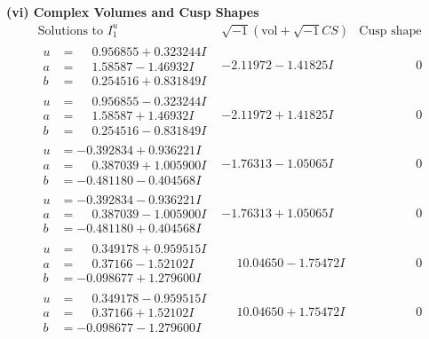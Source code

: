 \documentclass[1p]{elsarticle_modified}
\theoremstyle{definition}
\newcommand{\I}{\sqrt{-1}}
\begin{document}
\newpage\flushleft \textbf{(vi) Complex Volumes and Cusp Shapes}
$$\begin{array}{c|c|c}  
\text{Solutions to }I^u_{1}& \I (\text{vol} + \sqrt{-1}CS) & \text{Cusp shape}\\
 \hline 
\begin{aligned}
u &= \phantom{-}0.956855 + 0.323244 I \\
a &= \phantom{-}1.58587 - 1.46932 I \\
b &= \phantom{-}0.254516 + 0.831849 I\end{aligned}
 & -2.11972 - 1.41825 I & \phantom{-0.000000 } 0 \\ \hline\begin{aligned}
u &= \phantom{-}0.956855 - 0.323244 I \\
a &= \phantom{-}1.58587 + 1.46932 I \\
b &= \phantom{-}0.254516 - 0.831849 I\end{aligned}
 & -2.11972 + 1.41825 I & \phantom{-0.000000 } 0 \\ \hline\begin{aligned}
u &= -0.392834 + 0.936221 I \\
a &= \phantom{-}0.387039 + 1.005900 I \\
b &= -0.481180 - 0.404568 I\end{aligned}
 & -1.76313 - 1.05065 I & \phantom{-0.000000 } 0 \\ \hline\begin{aligned}
u &= -0.392834 - 0.936221 I \\
a &= \phantom{-}0.387039 - 1.005900 I \\
b &= -0.481180 + 0.404568 I\end{aligned}
 & -1.76313 + 1.05065 I & \phantom{-0.000000 } 0 \\ \hline\begin{aligned}
u &= \phantom{-}0.349178 + 0.959515 I \\
a &= \phantom{-}0.37166 - 1.52102 I \\
b &= -0.098677 + 1.279600 I\end{aligned}
 & \phantom{-}10.04650 - 1.75472 I & \phantom{-0.000000 } 0 \\ \hline\begin{aligned}
u &= \phantom{-}0.349178 - 0.959515 I \\
a &= \phantom{-}0.37166 + 1.52102 I \\
b &= -0.098677 - 1.279600 I\end{aligned}
 & \phantom{-}10.04650 + 1.75472 I & \phantom{-0.000000 } 0 \\ \hline\begin{aligned}

\end{aligned}
\end{array}$$
\end{document}
